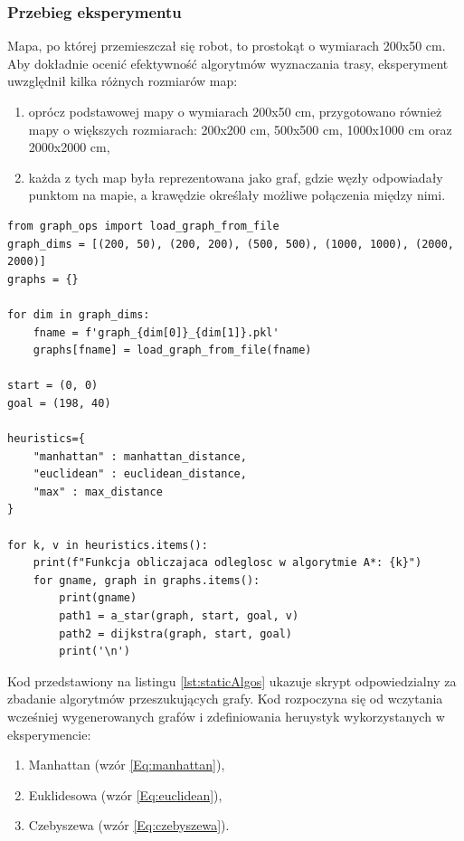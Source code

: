 \documentclass[12pt,twoside]{article}
\begin{document}
\subsubsection{Przebieg eksperymentu}
Mapa, po której przemieszczał się robot, to prostokąt o wymiarach 200x50 cm. Aby dokładnie ocenić efektywność algorytmów wyznaczania trasy, eksperyment uwzględnił kilka różnych rozmiarów map:

\begin{enumerate}[label=\alph*), leftmargin=1.25cm]
	\item oprócz podstawowej mapy o wymiarach 200x50 cm, przygotowano również mapy o większych rozmiarach: 200x200 cm, 500x500 cm, 1000x1000 cm oraz 2000x2000 cm,
	\item każda z tych map była reprezentowana jako graf, gdzie węzły odpowiadały punktom na mapie, a krawędzie określały możliwe połączenia między nimi.
	
\end{enumerate}

\begin{lstlisting}[caption={Porównanie algorytmów}, label={lst:staticAlgos}]
from graph_ops import load_graph_from_file
graph_dims = [(200, 50), (200, 200), (500, 500), (1000, 1000), (2000, 2000)]
graphs = {}

for dim in graph_dims:
    fname = f'graph_{dim[0]}_{dim[1]}.pkl'
    graphs[fname] = load_graph_from_file(fname)

start = (0, 0)
goal = (198, 40)

heuristics={
    "manhattan" : manhattan_distance,
    "euclidean" : euclidean_distance,
    "max" : max_distance
}

for k, v in heuristics.items():
    print(f"Funkcja obliczajaca odleglosc w algorytmie A*: {k}")
    for gname, graph in graphs.items():
        print(gname)
        path1 = a_star(graph, start, goal, v)
        path2 = dijkstra(graph, start, goal)
        print('\n')
\end{lstlisting}

Kod przedstawiony na listingu \ref{lst:staticAlgos} ukazuje skrypt odpowiedzialny za zbadanie algorytmów przeszukujących grafy. Kod rozpoczyna się od wczytania wcześniej wygenerowanych grafów i zdefiniowania heruystyk wykorzystanych w eksperymencie:

\begin{enumerate}[label=\alph*), leftmargin=1.25cm]
	\item Manhattan (wzór \ref{Eq:manhattan}),
	\item Euklidesowa (wzór \ref{Eq:euclidean}),
	\item Czebyszewa (wzór \ref{Eq:czebyszewa}).
	
\end{enumerate}
\end{document}

